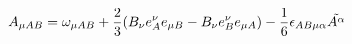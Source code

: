 \begin{equation}
A_{\mu AB} = \omega_{\mu AB} + {2 \over 3}(B_\nu e^\nu _A e_{\mu
B} - B_\nu e^\nu_B e_{\mu A}) - {1\over
6}{\epsilon}_{AB\mu\alpha}\tilde{A^\alpha}
\end{equation}

